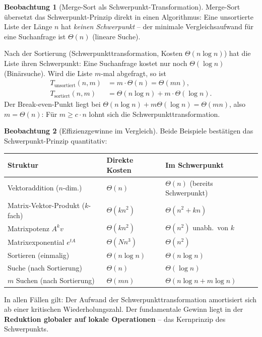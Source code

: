 ﻿\documentclass[a4paper,12pt]{report}
\theoremstyle{definition}
\newtheorem{beobachtung}{Beobachtung}
\begin{document}
\begin{beobachtung}[Merge-Sort als Schwerpunkt-Transformation]
    Merge-Sort übersetzt das Schwerpunkt-Prinzip direkt in einen
    Algorithmus: Eine unsortierte Liste der Länge $n$ hat
    \emph{keinen Schwerpunkt} -- der minimale Vergleichsaufwand für
    eine Suchanfrage ist $\Theta(n)$ (lineare Suche).

    Nach der Sortierung (Schwerpunkttransformation, Kosten $\Theta(n \log n)$)
    hat die Liste ihren Schwerpunkt: Eine Suchanfrage kostet nur noch
    $\Theta(\log n)$ (Binärsuche). Wird die Liste $m$-mal abgefragt, so ist
    \begin{align*}
        T_{\mathrm{unsortiert}}(n, m) &= m \cdot \Theta(n) = \Theta(mn), \\
        T_{\mathrm{sortiert}}(n, m)   &= \Theta(n \log n) + m \cdot \Theta(\log n).
    \end{align*}
    Der Break-even-Punkt liegt bei
    $\Theta(n \log n) + m \Theta(\log n) = \Theta(mn)$,
    also $m = \Theta(n)$: Für $m \geq c \cdot n$ lohnt sich die
    Schwerpunkttransformation.
\end{beobachtung}

\begin{beobachtung}[Effizienzgewinne im Vergleich]
    Beide Beispiele bestätigen das Schwer\-punkt-Prinzip quanti\-tativ:

    \begin{center}
    \begin{tabular}{lll}
        \hline
        Struktur & Direkte Kosten & Im Schwerpunkt \\
        \hline
        Vektoraddition ($n$-dim.) & $\Theta(n)$ & $\Theta(n)$ (bereits Schwerpunkt) \\
        Matrix-Vektor-Produkt ($k$-fach) & $\Theta(kn^2)$ & $\Theta(n^2 + kn)$ \\
        Matrixpotenz $A^k v$ & $\Theta(kn^2)$ & $\Theta(n^2)$ unabh.\ von $k$ \\
        Matrixexponential $e^{tA}$ & $\Theta(Nn^3)$ & $\Theta(n^2)$ \\
        Sortieren (einmalig) & $\Theta(n \log n)$ & $\Theta(n \log n)$ \\
        Suche (nach Sortierung) & $\Theta(n)$ & $\Theta(\log n)$ \\
        $m$ Suchen (nach Sortierung) & $\Theta(mn)$ & $\Theta(n\log n + m\log n)$ \\
        \hline
    \end{tabular}
    \end{center}

    In allen Fällen gilt: Der Aufwand der Schwerpunkttransformation
    amortisiert sich ab einer kritischen Wiederholungszahl.
    Der fundamentale Gewinn liegt in der \textbf{Reduktion globaler
    auf lokale Operationen} -- das Kernprinzip des Schwerpunkts.
\end{beobachtung}
\end{document}
